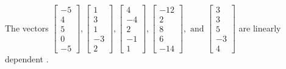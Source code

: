 \begin{exercise}
\begin{exerciseStatement}
  \end{exerciseStatement}
  \begin{exerciseAnswer}
   The vectors \(\left[\begin{array}{r}
-5 \\
4 \\
5 \\
0 \\
-5
\end{array}\right] , \left[\begin{array}{r}
1 \\
3 \\
1 \\
-3 \\
2
\end{array}\right] , \left[\begin{array}{r}
4 \\
-4 \\
2 \\
-1 \\
1
\end{array}\right] , \left[\begin{array}{r}
-12 \\
2 \\
8 \\
6 \\
-14
\end{array}\right] , \text{ and } \left[\begin{array}{r}
3 \\
3 \\
5 \\
-3 \\
4
\end{array}\right]\) are 
  	 linearly dependent  .
  


  \end{exerciseAnswer}
\end{exercise}